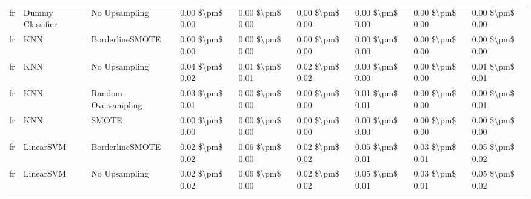 \begin{tabular}{lllllllll}
      fr &                Dummy Classifier &                 No Upsampling & 0.00 \$\textbackslash pm\$ 0.00 &           0.00 \$\textbackslash pm\$ 0.00 &       0.00 \$\textbackslash pm\$ 0.00 &        0.00 \$\textbackslash pm\$ 0.00 &                         0.00 \$\textbackslash pm\$ 0.00 &     0.00 \$\textbackslash pm\$ 0.00 \\
      fr &                             KNN &               BorderlineSMOTE & 0.00 \$\textbackslash pm\$ 0.00 &           0.00 \$\textbackslash pm\$ 0.00 &       0.00 \$\textbackslash pm\$ 0.00 &        0.00 \$\textbackslash pm\$ 0.00 &                         0.00 \$\textbackslash pm\$ 0.00 &     0.00 \$\textbackslash pm\$ 0.00 \\
      fr &                             KNN &                 No Upsampling & 0.04 \$\textbackslash pm\$ 0.02 &           0.01 \$\textbackslash pm\$ 0.01 &       0.02 \$\textbackslash pm\$ 0.02 &        0.00 \$\textbackslash pm\$ 0.00 &                         0.00 \$\textbackslash pm\$ 0.00 &     0.01 \$\textbackslash pm\$ 0.01 \\
      fr &                             KNN &           Random Oversampling & 0.03 \$\textbackslash pm\$ 0.01 &           0.00 \$\textbackslash pm\$ 0.00 &       0.00 \$\textbackslash pm\$ 0.00 &        0.01 \$\textbackslash pm\$ 0.01 &                         0.00 \$\textbackslash pm\$ 0.00 &     0.00 \$\textbackslash pm\$ 0.01 \\
      fr &                             KNN &                         SMOTE & 0.00 \$\textbackslash pm\$ 0.00 &           0.00 \$\textbackslash pm\$ 0.00 &       0.00 \$\textbackslash pm\$ 0.00 &        0.00 \$\textbackslash pm\$ 0.00 &                         0.00 \$\textbackslash pm\$ 0.00 &     0.00 \$\textbackslash pm\$ 0.00 \\
      fr &                       LinearSVM &               BorderlineSMOTE & 0.02 \$\textbackslash pm\$ 0.02 &           0.06 \$\textbackslash pm\$ 0.00 &       0.02 \$\textbackslash pm\$ 0.02 &        0.05 \$\textbackslash pm\$ 0.01 &                         0.03 \$\textbackslash pm\$ 0.01 &     0.05 \$\textbackslash pm\$ 0.02 \\
      fr &                       LinearSVM &                 No Upsampling & 0.02 \$\textbackslash pm\$ 0.02 &           0.06 \$\textbackslash pm\$ 0.00 &       0.02 \$\textbackslash pm\$ 0.02 &        0.05 \$\textbackslash pm\$ 0.01 &                         0.03 \$\textbackslash pm\$ 0.01 &     0.05 \$\textbackslash pm\$ 0.02 \\

\end{tabular}
